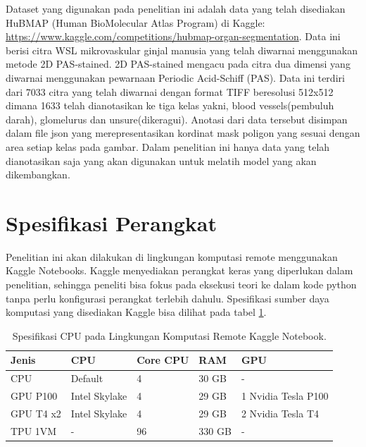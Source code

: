 \noindent Dataset yang digunakan pada penelitian ini adalah data yang telah disediakan HuBMAP (Human BioMolecular Atlas Program) di Kaggle: \url{https://www.kaggle.com/competitions/hubmap-organ-segmentation}\cite{hubmap-hacking}.  Data ini berisi citra WSL mikrovaskular ginjal manusia yang telah diwarnai menggunakan metode 2D PAS-stained. 2D PAS-stained mengacu pada citra dua dimensi yang diwarnai menggunakan pewarnaan Periodic Acid-Schiff (PAS). Data ini terdiri dari 7033 citra yang telah diwarnai dengan format TIFF beresolusi 512x512 dimana 1633 telah dianotasikan ke tiga kelas yakni, blood vessels(pembuluh darah), glomelurus dan unsure(dikeragui).  Anotasi dari data tersebut disimpan dalam file json yang merepresentasikan kordinat mask poligon yang sesuai dengan area setiap kelas pada gambar. Dalam penelitian ini hanya data yang telah dianotasikan saja yang akan digunakan untuk melatih model yang akan dikembangkan.



\section{Spesifikasi Perangkat}

\noindent Penelitian ini akan dilakukan di lingkungan komputasi remote menggunakan Kaggle Notebooks. Kaggle menyediakan perangkat keras yang diperlukan dalam penelitian, sehingga peneliti bisa fokus pada eksekusi teori ke dalam kode python tanpa perlu konfigurasi perangkat terlebih dahulu. Spesifikasi sumber daya komputasi yang disediakan Kaggle bisa dilihat pada tabel \ref{tab:cpu_specs}.
\begin{table}[h]
	\caption{Spesifikasi CPU pada Lingkungan Komputasi Remote Kaggle Notebook.} %
	\label{tab:cpu_specs}
	\begin{tabular}{lllll}
		\hline
		\textbf{Jenis} & \textbf{CPU}                             & \textbf{Core CPU} & \textbf{RAM} & \textbf{GPU}        \\ \hline
		CPU            & Default & 4                 & 30 GB        & -                   \\ \hline
		GPU P100       & Intel Skylake                            & 4                 & 29 GB        & 1 Nvidia Tesla P100 \\ \hline
		GPU T4 x2      & Intel Skylake                            & 4                 & 29 GB        & 2 Nvidia Tesla T4   \\ \hline
		TPU 1VM        & -                                        & 96                & 330 GB       & -                   \\ \hline
	\end{tabular}
\end{table}

